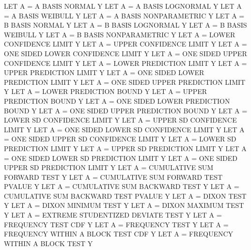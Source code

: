 {          LET A = A BASIS NORMAL                                Y
          LET A = A BASIS LOGNORMAL                             Y
          LET A = A BASIS WEIBULL                               Y
          LET A = A BASIS NONPARAMETRIC                         Y
          LET A = B BASIS NORMAL                                Y
          LET A = B BASIS LOGNORMAL                             Y
          LET A = B BASIS WEIBULL                               Y
          LET A = B BASIS NONPARAMETRIC                         Y
          LET A = LOWER CONFIDENCE LIMIT                        Y
          LET A = UPPER CONFIDENCE LIMIT                        Y
          LET A = ONE SIDED LOWER CONFIDENCE LIMIT              Y
          LET A = ONE SIDED UPPER CONFIDENCE LIMIT              Y
          LET A = LOWER PREDICTION LIMIT                        Y
          LET A = UPPER PREDICTION LIMIT                        Y
          LET A = ONE SIDED LOWER PREDICTION LIMIT              Y
          LET A = ONE SIDED UPPER PREDICTION LIMIT              Y
          LET A = LOWER PREDICTION BOUND                        Y
          LET A = UPPER PREDICTION BOUND                        Y
          LET A = ONE SIDED LOWER PREDICTION BOUND              Y
          LET A = ONE SIDED UPPER PREDICTION BOUND              Y
          LET A = LOWER SD CONFIDENCE LIMIT                     Y
          LET A = UPPER SD CONFIDENCE LIMIT                     Y
          LET A = ONE SIDED LOWER SD CONFIDENCE LIMIT           Y
          LET A = ONE SIDED UPPER SD CONFIDENCE LIMIT           Y
          LET A = LOWER SD PREDICTION LIMIT                     Y
          LET A = UPPER SD PREDICTION LIMIT                     Y
          LET A = ONE SIDED LOWER SD PREDICTION LIMIT           Y
          LET A = ONE SIDED UPPER SD PREDICTION LIMIT           Y
          LET A = CUMULATIVE SUM FORWARD TEST                   Y
          LET A = CUMULATIVE SUM FORWARD TEST PVALUE            Y
          LET A = CUMULATIVE SUM BACKWARD TEST                  Y
          LET A = CUMULATIVE SUM BACKWARD TEST PVALUE           Y
          LET A = DIXON TEST                                    Y
          LET A = DIXON MINIMUM TEST                            Y
          LET A = DIXON MAXIMUM TEST                            Y
          LET A = EXTREME STUDENTIZED DEVIATE TEST              Y
          LET A = FREQUENCY TEST CDF                            Y
          LET A = FREQUENCY TEST                                Y
          LET A = FREQUENCY WITHIN A BLOCK TEST CDF             Y
          LET A = FREQUENCY WITHIN A BLOCK TEST                 Y
}

